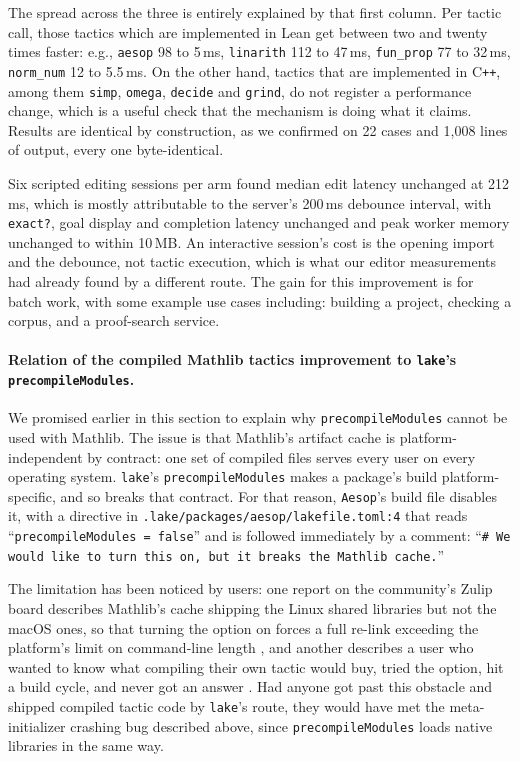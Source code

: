 \documentclass{article}
\newcommand{\Lean}{Lean\xspace}      %
\newcommand{\lake}{\texttt{lake}\xspace}      %
\newcommand{\mathlib}{Mathlib\xspace}
\begin{document}
The spread across the three is entirely explained by that first column. Per tactic call, those tactics which are implemented in \Lean get between two and twenty times faster: e.g., \texttt{aesop} 98 to 5\,ms, \texttt{linarith} 112 to 47\,ms, \texttt{fun\_prop} 77 to 32\,ms, \texttt{norm\_num} 12 to 5.5\,ms. On the other hand, tactics that are implemented in C\texttt{++}, among them \texttt{simp}, \texttt{omega}, \texttt{decide} and \texttt{grind}, do not register a performance change, which is a useful check that the mechanism is doing what it claims. Results are identical by construction, as we confirmed on 22 cases and 1{,}008 lines of output, every one byte-identical.

Six scripted editing sessions per arm found median edit latency unchanged at 212\,ms, which is mostly attributable to the server's 200\,ms debounce interval, with \texttt{exact?}, goal display and completion latency unchanged and peak worker memory unchanged to within 10\,MB. An interactive session's cost is the opening import and the debounce, not tactic execution, which is what our editor measurements had already found by a different route. The gain for this improvement is for batch work, with some example use cases including: building a project, checking a corpus, and a proof-search service.

\paragraph{Relation of the compiled \mathlib tactics improvement to \lake's \texttt{precompileModules}.}
We promised earlier in this section to explain why \texttt{precompileModules} cannot be used with \mathlib. The issue is that \mathlib's artifact cache is platform-independent by contract: one set of compiled files serves every user on every operating system. \lake's \texttt{precompileModules} makes a package's build platform-specific, and so breaks that contract. For that reason, \texttt{Aesop}'s build file disables it, with a directive in \texttt{.lake/packages/aesop/\allowbreak lakefile.toml:4} that reads ``\texttt{precompileModules = false}'' and is followed immediately by a comment: ``\texttt{\# We would like to turn this on, but it breaks the Mathlib cache.}'' 

The limitation has been noticed by users: one report on the community's Zulip board describes \mathlib's cache shipping the Linux shared libraries but not the macOS ones, so that turning the option on forces a full re-link exceeding the platform's limit on command-line length \cite{zulip-clang-argmax}, and another describes a user who wanted to know what compiling their own tactic would buy, tried the option, hit a build cycle, and never got an answer \cite{zulip-compiling-tactic}. Had anyone got past this obstacle and shipped compiled tactic code by \lake's route, they would have met the meta-initializer crashing bug described above, since \texttt{precompileModules} loads native libraries in the same way.
\end{document}

